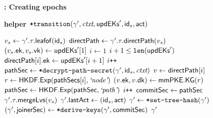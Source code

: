 \begin{figure*}[!p]
\begin{anybox}{\sffamily\bfseries \saik : Creating epochs}
\begin{minipage}[t]{.49\linewidth}
      \end{minipage}
		\hfill
			\begin{minipage}[t]{0.49\linewidth}
        {\bf {helper ${\textnormal{\tt*transition}}(\gamma', {\normalfont\textit{ctxt}}, {\mathsf{updEKs}}', {\mathsf{id}}_s, \mathsf{act})$}}
				\begin{algorithmic}
          \State {}
          \State $v_s \gets \gamma'.\tau.{\mathsf{leafof}}({\mathsf{id}}_s)$
          \State ${\mathsf{directPath}} \gets \gamma'.\tau.{\mathsf{directPath}}(v_s)$
          \State $(v_s.{\mathsf{ek}}, v_s.{\mathsf{vk}}) \gets {\ensuremath{\mathsf{updEKs}}}'[1]$
          \State $i \gets 1$
            \State {}
            \State \KwReq{} $i+1\leq\texttt{len}({\mathsf{updEKs}}')$
            \State ${\mathsf{directPath}}[i].{\mathsf{ek}} \gets {\ensuremath{\mathsf{updEKs}}}'[i+1]$
            \State $i\texttt{++}$
          \EndWhile
          \State {}
          \State \KwTry{} ${\mathsf{pathSec}} \gets {\ensuremath{\textnormal{\tt*decrypt-path-secret}}}(\gamma', {\mathsf{id}}_s, {\normalfont\textit{ctxt}})$
            \State $v \gets {\ensuremath{\mathsf{directPath}}}[i]$
					  \State $r \gets {\ensuremath{\mathsf{HKDF}}}.{\mathsf{Exp}}({\mathsf{pathSecs}}[i], {\text{\normalfont \it`node'}})$
            \State $(v.{\mathsf{ek}}, v.{\mathsf{dk}}) \gets {\ensuremath{\mathsf{mmPKE}}}.{\mathsf{KG}}(r)$
            \State ${\mathsf{pathSec}} \gets {\ensuremath{\mathsf{HKDF}}}.{\mathsf{Exp}}({\mathsf{pathSec}}, {\text{\normalfont \it`path'}})$
            \State $i\texttt{++}$
          \EndWhile
          \State ${\mathsf{commitSec}} \gets {\ensuremath{\mathsf{pathSec}}}$
          \State $\gamma'.\tau.{\mathsf{mergeLvs}}(v_s)$
          \State {}
          \State $\gamma'.{\mathsf{lastAct}} \gets ({\mathsf{id}}_s, \mathsf{act})$
          \State $\gamma' \gets {{\ensuremath{\textnormal{\tt*set-tree-hash}}}}(\gamma')$
          \State $(\gamma', {\mathsf{joinerSec}})  \gets {{\ensuremath{\textnormal{\tt*derive-keys}}}}(\gamma', {\mathsf{commitSec}})$
          \State \Return $\gamma'$
        \end{algorithmic}


\end{minipage}
\end{anybox}
\end{figure*}
